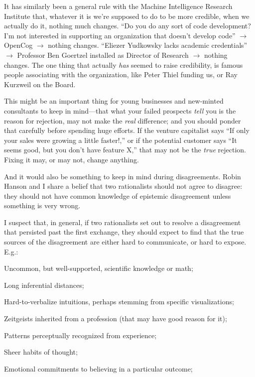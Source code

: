 {
 It has similarly been a general rule with the Machine Intelligence
Research Institute that, whatever it is we're supposed
to do to be more credible, when we actually do it, nothing much
changes. ``Do you do any sort of code development?
I'm not interested in supporting an organization that
doesn't develop code'' $\rightarrow $
OpenCog $\rightarrow $ nothing changes. ``Eliezer
Yudkowsky lacks academic credentials'' $\rightarrow $
Professor Ben Goertzel installed as Director of Research $\rightarrow $
nothing changes. The one thing that actually \textit{has} seemed to
raise credibility, is famous people associating with the organization,
like Peter Thiel funding us, or Ray Kurzweil on the Board.}

{
 This might be an important thing for young businesses and
new-minted consultants to keep in mind---that what your failed
prospects \textit{tell} you is the reason for rejection, may not make
the \textit{real} difference; and you should ponder that carefully
before spending huge efforts. If the venture capitalist says
``If only your sales were growing a little
faster!,'' or if the potential customer says
``It seems good, but you don't have
feature X,'' that may not be the \textit{true}
rejection. Fixing it may, or may not, change anything.}

{
 And it would also be something to keep in mind during
disagreements. Robin Hanson and I share a belief that two rationalists
should not agree to disagree: they should not have common knowledge of
epistemic disagreement unless something is very wrong.}

{
 I suspect that, in general, if two rationalists set out to resolve
a disagreement that persisted past the first exchange, they should
expect to find that the true sources of the disagreement are either
hard to communicate, or hard to expose. E.g.:}

{
 Uncommon, but well-supported, scientific knowledge or math;}

{
 Long inferential distances;}

{
 Hard-to-verbalize intuitions, perhaps stemming from specific
visualizations;}

{
 Zeitgeists inherited from a profession (that may have good reason
for it);}

{
 Patterns perceptually recognized from experience;}

{
 Sheer habits of thought;}

{
 Emotional commitments to believing in a particular outcome;}


